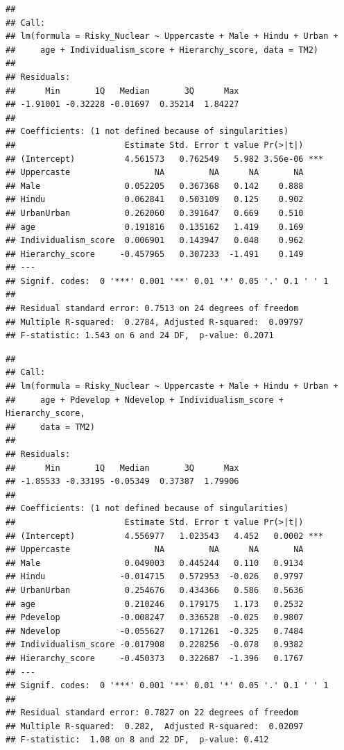 \documentclass[
]{article}
\begin{document}
\begin{verbatim}
## 
## Call:
## lm(formula = Risky_Nuclear ~ Uppercaste + Male + Hindu + Urban + 
##     age + Individualism_score + Hierarchy_score, data = TM2)
## 
## Residuals:
##      Min       1Q   Median       3Q      Max 
## -1.91001 -0.32228 -0.01697  0.35214  1.84227 
## 
## Coefficients: (1 not defined because of singularities)
##                      Estimate Std. Error t value Pr(>|t|)    
## (Intercept)          4.561573   0.762549   5.982 3.56e-06 ***
## Uppercaste                 NA         NA      NA       NA    
## Male                 0.052205   0.367368   0.142    0.888    
## Hindu                0.062841   0.503109   0.125    0.902    
## UrbanUrban           0.262060   0.391647   0.669    0.510    
## age                  0.191816   0.135162   1.419    0.169    
## Individualism_score  0.006901   0.143947   0.048    0.962    
## Hierarchy_score     -0.457965   0.307233  -1.491    0.149    
## ---
## Signif. codes:  0 '***' 0.001 '**' 0.01 '*' 0.05 '.' 0.1 ' ' 1
## 
## Residual standard error: 0.7513 on 24 degrees of freedom
## Multiple R-squared:  0.2784, Adjusted R-squared:  0.09797 
## F-statistic: 1.543 on 6 and 24 DF,  p-value: 0.2071
\end{verbatim}

\begin{verbatim}
## 
## Call:
## lm(formula = Risky_Nuclear ~ Uppercaste + Male + Hindu + Urban + 
##     age + Pdevelop + Ndevelop + Individualism_score + Hierarchy_score, 
##     data = TM2)
## 
## Residuals:
##      Min       1Q   Median       3Q      Max 
## -1.85533 -0.33195 -0.05349  0.37387  1.79906 
## 
## Coefficients: (1 not defined because of singularities)
##                      Estimate Std. Error t value Pr(>|t|)    
## (Intercept)          4.556977   1.023543   4.452   0.0002 ***
## Uppercaste                 NA         NA      NA       NA    
## Male                 0.049003   0.445244   0.110   0.9134    
## Hindu               -0.014715   0.572953  -0.026   0.9797    
## UrbanUrban           0.254676   0.434366   0.586   0.5636    
## age                  0.210246   0.179175   1.173   0.2532    
## Pdevelop            -0.008247   0.336528  -0.025   0.9807    
## Ndevelop            -0.055627   0.171261  -0.325   0.7484    
## Individualism_score -0.017908   0.228256  -0.078   0.9382    
## Hierarchy_score     -0.450373   0.322687  -1.396   0.1767    
## ---
## Signif. codes:  0 '***' 0.001 '**' 0.01 '*' 0.05 '.' 0.1 ' ' 1
## 
## Residual standard error: 0.7827 on 22 degrees of freedom
## Multiple R-squared:  0.282,  Adjusted R-squared:  0.02097 
## F-statistic:  1.08 on 8 and 22 DF,  p-value: 0.412
\end{verbatim}
\end{document}
